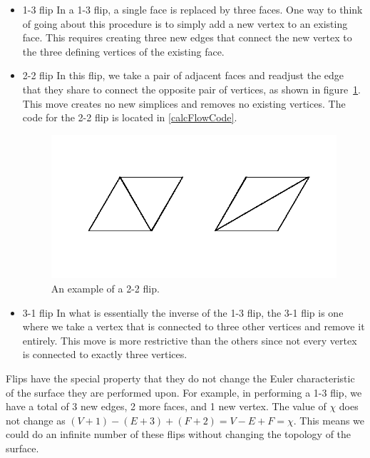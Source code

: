 \documentclass[12pt]{article}
\begin{document}
\begin{itemize}
\item 1-3 flip \newline
In a 1-3 flip, a single face is replaced by three faces. One way to think of going about this procedure is to simply add a new vertex to an existing face. This requires creating three new edges that connect the new vertex to the three defining vertices of the existing face.
\item 2-2 flip \newline
In this flip, we take a pair of adjacent faces and readjust the edge that they share to connect the opposite pair of vertices, as shown in figure~\ref{fig:flip}. This move creates no new simplices and removes no existing vertices. The code for the 2-2 flip is located in \ref{calcFlowCode}.


\begin{figure}
\centering
\includegraphics[scale = 0.8]{Flip.png}
\caption{An example of a 2-2 flip.}
\label{fig:flip}
\end{figure}

\item 3-1 flip \newline
In what is essentially the inverse of the 1-3 flip, the 3-1 flip is one where we take a vertex that is connected to three other vertices and remove it entirely. This move is more restrictive than the others since not every vertex is connected to exactly three vertices. 
\end{itemize}
Flips have the special property that they do not change the Euler characteristic of the surface they are performed upon. For example, in performing a 1-3 flip, we have a total of 3 new edges, 2 more faces, and 1 new vertex. The value of $\chi$ does not change as $(V+1) - (E+3) + (F+2) = V - E + F = \chi$. This means we could do an infinite number of these flips without changing the topology of the surface. \newline
\end{document}

